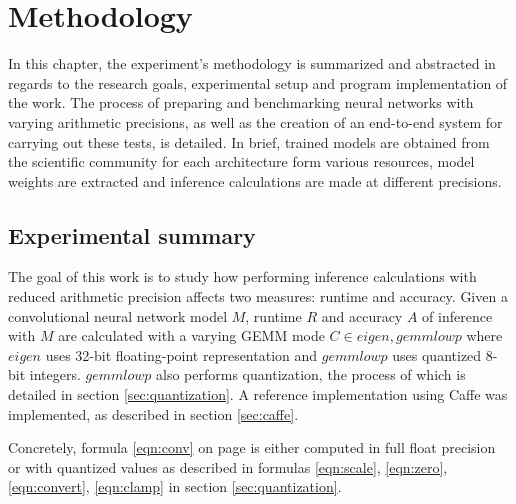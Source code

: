 \chapter{Methodology}

In this chapter, the experiment's methodology is summarized and abstracted in regards to the research goals, experimental setup and program implementation of the work. The process of preparing and benchmarking neural networks with varying arithmetic precisions, as well as the creation of an end-to-end system for carrying out these tests, is detailed. In brief, trained models are obtained from the scientific community for each architecture form various resources, model weights are extracted and inference calculations are made at different precisions.

\section{Experimental summary}
The goal of this work is to study how performing inference calculations with reduced arithmetic precision affects two measures: runtime and accuracy. Given a convolutional neural network model $M$, runtime $R$ and accuracy $A$ of inference with $M$ are calculated with a varying GEMM mode $C \in{eigen, gemmlowp}$ where $eigen$ \cite{eigen} uses 32-bit floating-point representation and $gemmlowp$ \cite{gemmlowp} uses quantized 8-bit integers. $gemmlowp$ also performs quantization, the process of which is detailed in section \ref{sec:quantization}. A reference implementation using Caffe \cite{caffe} was implemented, as described in section \ref{sec:caffe}.

Concretely, formula \ref{eqn:conv} on page \pageref{eqn:conv} is either computed in full float precision or with quantized values as described in formulas \ref{eqn:scale}, \ref{eqn:zero}, \ref{eqn:convert}, \ref{eqn:clamp} in section \ref{sec:quantization}.

